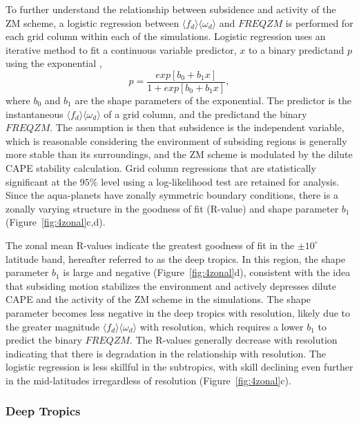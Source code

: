 \documentclass[times]{qjrms4}
\begin{document}
To further understand the relationship between subsidence and activity of the ZM scheme, a logistic regression between $\langle f_{d} \rangle \langle \omega_{d} \rangle$ and $FREQZM$ is performed for each grid column within each of the simulations. Logistic regression uses an iterative method to fit a continuous variable predictor, $x$ to a binary predictand $p$ using the exponential \citep{WILKSBOOK},
\begin{equation}
p = \frac{exp{[b_0 + b_1 x]}}{1 + exp{[b_0 + b_1 x]}}, \label{eq:logreg}
\end{equation}
where $b_0$ and $b_1$ are the shape parameters of the exponential. The predictor is the instantaneous $\langle f_{d} \rangle \langle \omega_{d} \rangle$ of a grid column, and the predictand the binary $FREQZM$. The assumption is then that subsidence is the independent variable, which is reasonable considering the environment of subsiding regions is generally more stable than its surroundings, and the ZM scheme is modulated by the dilute CAPE stability calculation. Grid column regressions that are statistically significant at the $95\%$ level using a log-likelihood test \citep{WILKSBOOK} are retained for analysis. Since the aqua-planets have zonally symmetric boundary conditions, there is a zonally varying structure in the goodness of fit (R-value) and shape parameter $b_1$ (Figure~\ref{fig:4zonal}c,d).

The zonal mean R-values indicate the greatest goodness of fit in the $\pm 10^{\circ}$ latitude band, hereafter referred to as the deep tropics. In this region, the shape parameter $b_1$ is large and negative (Figure~\ref{fig:4zonal}d), consistent with the idea that subsiding motion stabilizes the environment and actively depresses dilute CAPE and the activity of the ZM scheme in the simulations. The shape parameter becomes less negative in the deep tropics with resolution, likely due to the greater magnitude $\langle f_{d} \rangle \langle \omega_{d} \rangle$ with resolution, which requires a lower $b_1$ to predict the binary $FREQZM$. The R-values generally decrease with resolution indicating that there is degradation in the relationship with resolution. The logistic regression is less skillful in the subtropics, with skill declining even further in the mid-latitudes irregardless of resolution (Figure~\ref{fig:4zonal}c).

\subsubsection{Deep Tropics}
\end{document}
